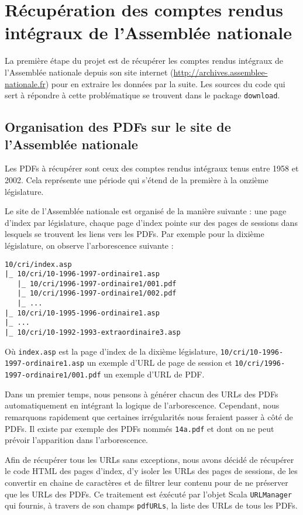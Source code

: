\section[Récupération des comptes rendus intégraux]{Récupération des comptes rendus intégraux de l'Assemblée nationale}

La première étape du projet est de récupérer les comptes rendus intégraux de l'Assemblée nationale depuis son site internet (\url{http://archives.assemblee-nationale.fr}) pour en extraire les données par la suite. Les sources du code qui sert à répondre à cette problématique se trouvent dans le package \verb|download|.

\subsection{Organisation des PDFs sur le site de l'Assemblée nationale}

Les PDFs à récupérer sont ceux des comptes rendus intégraux tenus entre 1958 et 2002. Cela représente une période qui s'étend de la première à la onzième législature.

Le site de l'Assemblée nationale est organisé de la manière suivante : une page d'index par législature, chaque page d'index pointe sur des pages de sessions dans lesquels se trouvent les liens vers les PDFs. Par exemple pour la dixième législature, on observe l'arborescence suivante :
\begin{verbatim}
10/cri/index.asp
|_ 10/cri/10-1996-1997-ordinaire1.asp
   |_ 10/cri/1996-1997-ordinaire1/001.pdf
   |_ 10/cri/1996-1997-ordinaire1/002.pdf
   |_ ...
|_ 10/cri/10-1995-1996-ordinaire1.asp
|_ ...
|_ 10/cri/10-1992-1993-extraordinaire3.asp
\end{verbatim}
Où \verb|index.asp| est la page d'index de la dixième législature, \verb|10/cri/10-1996-1997-ordinaire1.asp| un exemple d'URL de page de session et \verb|10/cri/1996-1997-ordinaire1/001.pdf| un exemple d'URL de PDF.

Dans un premier temps, nous pensons à générer chacun des URLs des PDFs automatiquement en intégrant la logique de l'arborescence. Cependant, nous remarquons rapidement que certaines irrégularités nous feraient passer à côté de PDFs. Il existe par exemple des PDFs nommés \verb|14a.pdf| et dont on ne peut prévoir l'apparition dans l'arborescence.

Afin de récupérer tous les URLs sans exceptions, nous avons décidé de récupérer le code HTML des pages d'index, d'y isoler les URLs des pages de sessions, de les convertir en chaine de caractères et de filtrer leur contenu pour de ne préserver que les URLs des PDFs. Ce traitement est éxécuté par l'objet Scala \verb|URLManager| qui fournis, à travers de son champs \verb|pdfURLs|, la liste des URLs de tous les PDFs.

